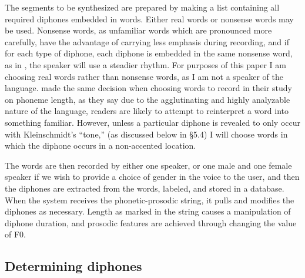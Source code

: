 \documentclass[12pt]{article}
\begin{document}
The segments to be synthesized are prepared by making a list containing all required diphones embedded in words. Either real words or nonsense words may be used. Nonsense words, as unfamiliar words which are pronounced more carefully, have the advantage of carrying less emphasis during recording, and if for each type of diphone, each diphone is embedded in the same nonsense word, as in \citet{mongolian}, the speaker will use a steadier rhythm. For purposes of this paper I am choosing real words rather than nonsense words, as I am not a speaker of the language. \citet{quan} made the same decision when choosing words to record in their study on phoneme length, as they say due to the agglutinating and highly analyzable nature of the language, readers are likely to attempt to reinterpret a word into something familiar. However, unless a particular diphone is revealed to only occur with Kleinschmidt's ``tone,'' (as discussed below in \S 5.4) I will choose words in which the diphone occurs in a non-accented location.\par

The words are then recorded by either one speaker, or one male and one female speaker if we wish to provide a choice of gender in the voice to the user, and then the diphones are extracted from the words, labeled, and stored in a database. When the system receives the phonetic-prosodic string, it pulls and modifies the diphones as necessary. Length as marked in the string causes a manipulation of diphone duration, and prosodic features are achieved through changing the value of F0.\par

	\subsection{Determining diphones}
\end{document}
